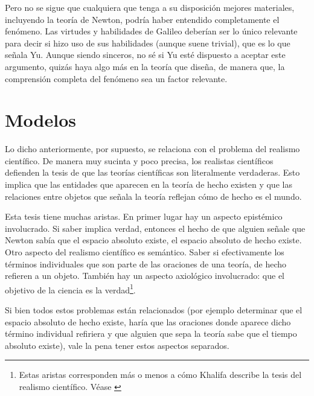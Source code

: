 Pero no se sigue que cualquiera que tenga a su disposición mejores materiales, incluyendo la teoría de Newton, podría haber entendido completamente el fenómeno. Las virtudes y habilidades de Galileo deberían ser lo único relevante para decir si hizo uso de sus habilidades (aunque suene trivial), que es lo que señala Yu. Aunque siendo sinceros, no sé si Yu esté dispuesto a aceptar este argumento, quizás haya algo más en la teoría que diseña, de manera que, la comprensión completa del fenómeno sea un factor relevante.


\section{Modelos}

Lo dicho anteriormente, por supuesto, se relaciona con el problema del realismo científico. De manera muy sucinta y poco precisa, los realistas científicos defienden la tesis de que las teorías científicas son literalmente verdaderas. Esto implica que las entidades que aparecen en la teoría de hecho existen y que las relaciones entre objetos que señala la teoría reflejan cómo de hecho es el mundo.

Esta tesis tiene muchas aristas. En primer lugar hay un aspecto epistémico involucrado. Si saber implica verdad, entonces el hecho de que alguien señale que Newton sabía que el espacio absoluto existe, el espacio absoluto de hecho existe. Otro aspecto del realismo científico es semántico. Saber si efectivamente los términos individuales que son parte de las oraciones de una teoría, de hecho refieren a un objeto. También hay un aspecto axiológico involucrado: que el objetivo de la ciencia es la verdad\footnote{Estas aristas corresponden más o menos a cómo Khalifa describe la tesis del realismo científico. Véase \citeyear{khalifa2010}}.

Si bien todos estos problemas están relacionados (por ejemplo determinar que el espacio absoluto de hecho existe, haría que las oraciones donde aparece dicho término individual refiriera y que alguien que sepa la teoría sabe que el tiempo absoluto existe), vale la pena tener estos aspectos separados. 

